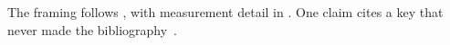 \documentclass{article}
\begin{document}
The framing follows \citet{smith2024}, with measurement detail in
\citep[see][p.~45]{chenlee2023}. One claim cites a key that never made the
bibliography~\cite{ghost2024}.


\end{document}
